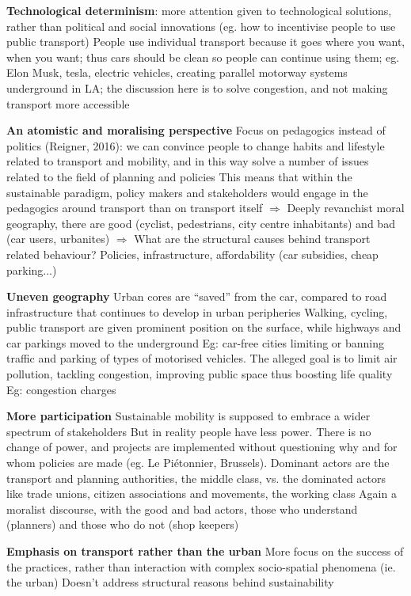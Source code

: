 \documentclass{article}
\begin{document}
\begin{outline}
	\1 \textbf{Technological determinism}: more attention given to technological solutions, rather than political and social innovations (eg. how to incentivise people to use public transport)
		\2 People use individual transport because it goes where you want, when you want; thus cars should be clean so people can continue using them; eg. Elon Musk, tesla, electric vehicles, creating parallel motorway systems underground in LA; the discussion here is to solve congestion, and not making transport more accessible
		
	\1 \textbf{An atomistic and moralising perspective}
		\2 Focus on pedagogics instead of politics (Reigner, 2016): we can convince people to change habits and lifestyle related to transport and mobility, and in this way solve a number of issues related to the field of planning and policies
		\2 This means that within the sustainable paradigm, policy makers and stakeholders would engage in the pedagogics around transport than on transport itself
		\2 $\Rightarrow$ Deeply revanchist moral geography, there are good (cyclist, pedestrians, city centre inhabitants) and bad (car users, urbanites)
		\2 $\Rightarrow$ What are the structural causes behind transport related behaviour? Policies, infrastructure, affordability (car subsidies, cheap parking...)
		
	\1 \textbf{Uneven geography}
		\2 Urban cores are ``saved'' from the car, compared to road infrastructure that continues to develop in urban peripheries
		\2 Walking, cycling, public transport are given prominent position on the surface, while highways and car parkings moved to the underground
		\2 Eg: car-free cities limiting or banning traffic and parking of types of motorised vehicles. The alleged goal is to limit air pollution, tackling congestion, improving public space thus boosting life quality
		\2 Eg: congestion charges
		
	\1 \textbf{More participation}
		\2 Sustainable mobility is supposed to embrace a wider spectrum of stakeholders
		\2 But in reality people have less power. There is no change of power, and projects are implemented without questioning why and for whom policies are made (eg. Le Piétonnier, Brussels). 
		\2 Dominant actors are the transport and planning authorities, the middle class, vs. the dominated actors like trade unions, citizen associations and movements, the working class
		\2 Again a moralist discourse, with the good and bad actors, those who understand (planners) and those who do not (shop keepers)
	
	\1 \textbf{Emphasis on transport rather than the urban}
		\2 More focus on the success of the practices, rather than interaction with complex socio-spatial phenomena (ie. the urban)
		\2 Doesn't address structural reasons behind sustainability
\end{outline}
\end{document}
